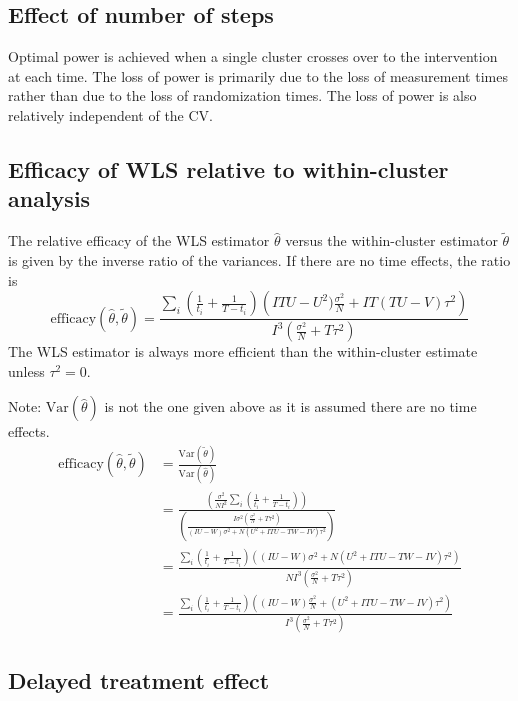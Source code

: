 \documentclass{article}
\newcommand{\Var}{\mathrm{Var}}
\begin{document}
\subsection{Effect of number of steps}

Optimal power is achieved when a single cluster crosses over to the intervention at each time. The loss of power is primarily due to the loss of measurement times rather than due to the loss of randomization times. The loss of power is also relatively independent of the CV.

\subsection{Efficacy of WLS relative to within-cluster analysis}

The relative efficacy of the WLS estimator $\hat{\theta}$ versus the within-cluster estimator $\tilde{\theta}$ is given by the inverse ratio of the variances. If there are no time effects, the ratio is
\[
\mathrm{efficacy}(\hat{\theta},\tilde{\theta}) = \frac{\sum_i\left(\frac{1}{t_i}+\frac{1}{T-t_i}\right)\left(ITU-U^2)\frac{\sigma^2}{N}+IT(TU-V)\tau^2\right)}{I^3\left(\frac{\sigma^2}{N}+T\tau^2\right)}
\]
The WLS estimator is always more efficient than the within-cluster estimate unless $\tau^2=0$.

Note: $\Var(\hat{\theta})$ is not the one given above as it is assumed there are no time effects.
\begin{align*}
\mathrm{efficacy}(\hat{\theta},\tilde{\theta}) &= \frac{\Var(\tilde{\theta})}{\Var(\hat{\theta})} \\
&= \frac{\left(\frac{\sigma^2}{NI^2}\sum_i\left(\frac{1}{t_i}+\frac{1}{T-t_i}\right)\right)}{\left(\frac{I\sigma^2\left(\frac{\sigma^2}{N}+T\tau^2\right)}{(IU-W)\sigma^2+N(U^2+ITU-TW-IV)\tau^2}\right)} \\
&= \frac{\sum_i\left(\frac{1}{t_i}+\frac{1}{T-t_i}\right)\left((IU-W)\sigma^2+N(U^2+ITU-TW-IV)\tau^2\right)}{NI^3\left(\frac{\sigma^2}{N}+T\tau^2\right)} \\
&= \frac{\sum_i\left(\frac{1}{t_i}+\frac{1}{T-t_i}\right)\left((IU-W)\frac{\sigma^2}{N}+(U^2+ITU-TW-IV)\tau^2\right)}{I^3\left(\frac{\sigma^2}{N}+T\tau^2\right)} 
\end{align*}

\subsection{Delayed treatment effect}
\end{document}
